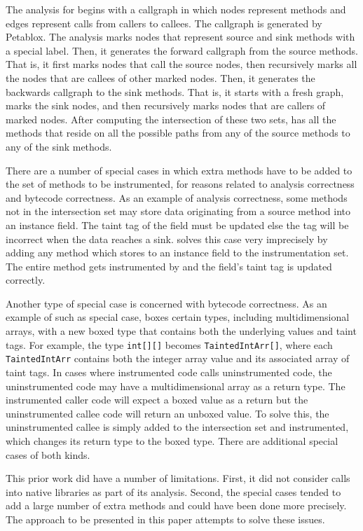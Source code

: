 The analysis for \phosphorpi{} begins with a callgraph in which nodes
represent methods and edges represent calls from callers to
callees. The callgraph is generated by Petablox. The analysis marks
nodes that represent source and sink methods with a special
label. Then, it generates the forward callgraph from the source
methods. That is, it first marks nodes that call the source nodes,
then recursively marks all the nodes that are callees of other marked
nodes. Then, it generates the backwards callgraph to the sink
methods. That is, it starts with a fresh graph, marks the sink nodes,
and then recursively marks nodes that are callers of marked
nodes. After computing the intersection of these two sets,
\phosphorpi{} has all the methods that reside on all the possible
paths from any of the source methods to any of the sink methods.

There are a number of special cases in which extra methods have to be
added to the set of methods to be instrumented, for reasons related to
analysis correctness and bytecode correctness. As an example of
analysis correctness, some methods not in the intersection set may
store data originating from a source method into an instance
field. The taint tag of the field must be updated else the tag will be
incorrect when the data reaches a sink. \phosphorpi{} solves this case
very imprecisely by adding any method which stores to an instance
field to the instrumentation set. The entire method gets instrumented
by \phosphor{} and the field's taint tag is updated correctly.

Another type of special case is concerned with bytecode
correctness. As an example of such as special case, \phosphor{} boxes
certain types, including multidimensional arrays, with a new boxed
type that contains both the underlying values and taint tags. For
example, the type \texttt{int[][]} becomes \texttt{TaintedIntArr[]},
where each \texttt{TaintedIntArr} contains both the integer array
value and its associated array of taint tags. In cases where
instrumented code calls uninstrumented code, the uninstrumented code
may have a multidimensional array as a return type. The instrumented
caller code will expect a boxed value as a return but the
uninstrumented callee code will return an unboxed value. To solve
this, the uninstrumented callee is simply added to the intersection
set and instrumented, which changes its return type to the boxed
type. There are additional special cases of both kinds.

This prior work did have a number of limitations. First, it did not
consider calls into native libraries as part of its analysis. Second,
the special cases tended to add a large number of extra methods and
could have been done more precisely. The approach to be presented in
this paper attempts to solve these issues.

